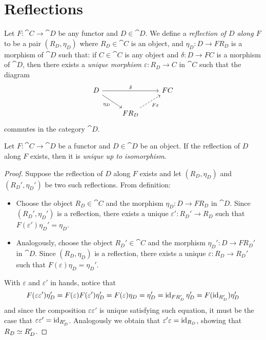 \section{Reflections}

\begin{definition}
    \label{def:reflection-functor}
    Let \(F: \cat C \to \cat D\) be any functor and \(D \in \cat D\). We define a
    \emph{reflection of \(D\) along \(F\)} to be a pair \((R_D, \eta_D)\) where
    \(R_D \in \cat C\) is an object, and \(\eta_D: D \to F R_D\) is a morphism of
    \(\cat D\) such that: if \(C \in \cat C\) is any object and
    \(\delta: D \to F C\) is a morphism of \(\cat D\), then there exists a
    \emph{unique morphism} \(\varepsilon: R_D \to C\) in \(\cat C\) such that the
    diagram
    \[
        \begin{tikzcd}
            D \ar[rd, "\eta_D"'] \ar[rr, "\delta"] & &F C \\
            &F R_D \ar[ru, dashed, "F \varepsilon"'] &
        \end{tikzcd}
    \]
    commutes in the category \(\cat D\).
\end{definition}

\begin{proposition}
    \label{prop:reflection-unique-up-to-iso}
    Let \(F: \cat C \to \cat D\) be a functor and \(D \in \cat D\) be an object. If
    the reflection of \(D\) along \(F\) exists, then it is \emph{unique up to
        isomorphism}.
\end{proposition}

\begin{proof}
    Suppose the reflection of \(D\) along \(F\) exists and let \((R_D, \eta_D)\) and
    \((R_D', \eta_D')\) be two such reflections. From definition:
    \begin{itemize}\setlength\itemsep{0em}
        \item Choose the object \(R_D \in \cat C\) and the morphism
              \(\eta_D: D \to F R_D\) in \(\cat D\). Since \((R_D', \eta_D')\) is a reflection,
              there exists a unique \(\varepsilon': R_D' \to R_D\) such that \(F(\varepsilon') \eta_D' = \eta_D\).

        \item Analogously, choose the object \(R_D' \in \cat C\) and the morphism
              \(\eta_D': D \to F R_D'\) in \(\cat D\). Since \((R_D, \eta_D)\) is a reflection,
              there exists a unique \(\varepsilon: R_D \to R_D'\) such that \(F(\varepsilon) \eta_D = \eta_D'\).
    \end{itemize}
    With \(\varepsilon\) and \(\varepsilon'\) in hands, notice that
    \[
        F(\varepsilon \varepsilon') \eta_D' = F(\varepsilon) F(\varepsilon') \eta_D' = F(\varepsilon) \eta_D = \eta_D'
        = \operatorname{id}_{F R_D'} \eta_D' = F(\operatorname{id}_{R_D'}) \eta_D'
    \]
    and since the composition \(\varepsilon \varepsilon'\) is unique satisfying such equation, it must
    be the case that \(\varepsilon \varepsilon' = \operatorname{id}_{R_D'}\). Analogously we obtain that
    \(\varepsilon' \varepsilon = \operatorname{id}_{R_D}\), showing that \(R_D \simeq R_D'\).
\end{proof}

